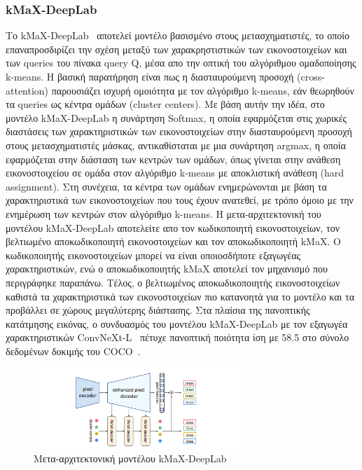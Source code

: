 \documentclass[12pt]{article}
\numberwithin{equation}{section}
\begin{document}
\subsubsection{kMaX-DeepLab}

Το kMaX-DeepLab~\cite{yu2023kmaxdeeplabkmeansmasktransformer} αποτελεί μοντέλο βασισμένο στους μετασχηματιστές, το οποίο επαναπροσδιρίζει την σχέση μεταξύ των χαρακρηστιστικών των εικονοστοιχείων και των queries του πίνακα query Q, μέσα απο την οπτική του αλγόριθμου ομαδοποίησης k-means. Η βασική παρατήρηση είναι πως η διασταυρούμενη προσοχή (cross-attention) παρουσιάζει ισχυρή ομοιότητα με τον αλγόριθμο k-means, εάν θεωρηθούν τα queries ως κέντρα ομάδων (cluster centers). Με βάση αυτήν την ιδέα, στο μοντέλο kMaX-DeepLab η συνάρτηση Softmax, η οποία εφαρμόζεται στις χωρικές διαστάσεις των χαρακτηριστικών των εικονοστοιχείων στην διασταυρούμενη προσοχή στους μετασχηματιστές μάσκας, αντικαθίσταται με μια συνάρτηση argmax, η οποία εφαρμόζεται στην διάσταση των κεντρών των ομάδων, όπως γίνεται στην ανάθεση εικονοστοιχείου σε ομάδα στον αλγόριθμο k-means με αποκλιστική ανάθεση (hard assignment). Στη συνέχεια, τα κέντρα των ομάδων ενημερώνονται με βάση τα χαρακτηριστικά των εικονοστοιχείων που τους έχουν ανατεθεί, με τρόπο όμοιο με την ενημέρωση των κεντρών στον αλγόριθμο k-means. Η μετα-αρχιτεκτονική του μοντέλου kMaX-DeepLab αποτελείτε απο τον κωδικοποιητή εικονοστοιχείων, τον βελτιωμένο αποκωδικοποιητή εικονοστοιχείων και τον αποκωδικοποιητή kMaX. Ο κωδικοποιητής εικονοστοιχείων μπορεί να είναι οποιοσδήποτε εξαγωγέας χαρακτηριστικών, ενώ ο αποκωδικοποιητής kMaX αποτελεί τον μηχανισμό που περιγράφηκε παραπάνω. Τέλος, ο βελτιωμένος αποκωδικοποιητής εικονοστοιχείων καθιστά τα χαρακτηριστικά των εικονοστοιχείων πιο κατανοητά για το μοντέλο και τα προβάλλει σε χώρους μεγαλύτερης διάστασης. Στα πλαίσια της πανοπτικής κατάτμησης εικόνας, ο συνδυασμός του μοντέλου kMaX-DeepLab με τον εξαγωγέα χαρακτηριστικών ConvNeXt-L~\cite{liu2022convnet2020s} πέτυχε πανοπτική ποιότητα ίση με 58.5 στο σύνολο δεδομένων δοκιμής του COCO~\cite{lin2015microsoftcococommonobjects}.\\

\begin{figure}[h!]
  \centering
  \includegraphics[width=0.7\textwidth]{images/kMaX.png} %
  \caption{Μετα-αρχιτεκτονική μοντέλου kMaX-DeepLab}
  \label{figure 20}
\end{figure} 
\end{document}
